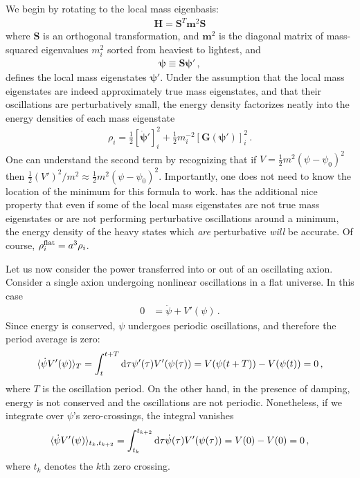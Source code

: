 \documentclass[11pt]{article}
\begin{document}
We begin by rotating to the local mass eigenbasis:
\begin{align}
    \bm H = \bm S^T \bm m^2 \bm S
\end{align}
where $\bm S$ is an orthogonal transformation, and $\bm m^2$ is the diagonal matrix of mass-squared eigenvalues $m_i^2$ sorted from heaviest to lightest, and 
\begin{align}
    \bm\psi\equiv \bm S{\bm\psi}'\,,
\end{align}
defines the local mass eigenstates $\bm\psi'$.
Under the assumption that the local mass eigenstates are indeed approximately true mass eigenstates, and that their oscillations are perturbatively small, the energy density factorizes neatly into the energy densities of each mass eigenstate
\begin{align}\label{eqn:local_energy_density}
    \rho_i = \frac12 [\dot{\bm\psi}']_i^2 + \frac12m_i^{-2}[\bm G(\bm\psi')]_i^2\,.
\end{align}
One can understand the second term by recognizing that if $V = \frac12m^2(\psi - \psi_0)^2$ then $\frac12(V')^2/m^2\approx \frac12m^2(\psi-\psi_0)^2$. Importantly, one does not need to know the location of the minimum for this formula to work.  has the additional nice property that even if some of the local mass eigenstates are not true mass eigenstates or are not performing perturbative oscillations around a minimum, the energy density of the heavy states which \emph{are} perturbative \emph{will} be accurate. Of course, $\rho_i^{\rm flat} = a^3\rho_i$.

Let us now consider the power transferred into or out of an oscillating axion. Consider a single axion undergoing nonlinear oscillations in a flat universe. In this case
\begin{align}\label{eqn:single_axion}
    0&=\ddot\psi + V'(\psi)\,.
\end{align}
Since energy is conserved, $\psi$ undergoes periodic oscillations, and therefore the period average is zero:
\begin{align}
    \langle\dot\psi V'(\psi)\rangle_T = \int_t^{t + T}{\rm d}\tau \psi'(\tau)V'(\psi(\tau)) = V(\psi(t + T)) - V(\psi(t)) = 0\,,
\end{align}
where $T$ is the oscillation period.
On the other hand, in the presence of damping, energy is not conserved and the oscillations are not periodic. Nonetheless, if we integrate over $\psi$'s zero-crossings, the integral vanishes
\begin{align}
    \langle\dot\psi V'(\psi)\rangle_{t_k,t_{{k + 2}}} = \int_{t_k}^{t_{k + 2}}{\rm d}\tau \dot\psi(\tau) V'(\psi(\tau)) = V(0) - V(0) = 0\,,
\end{align}
where $t_k$ denotes the $k$th zero crossing.
\end{document}
